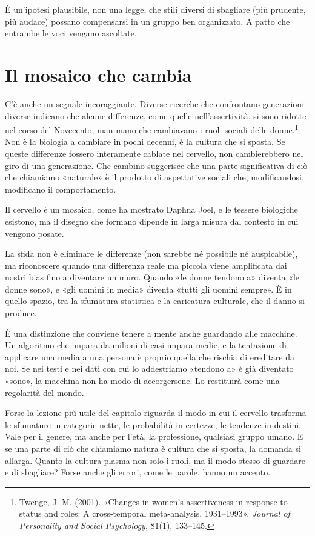 È un'ipotesi plausibile, non una legge, che stili diversi di sbagliare (più prudente, più audace) possano compensarsi in un gruppo ben organizzato. A patto che entrambe le voci vengano ascoltate.

\section{Il mosaico che cambia}

C'è anche un segnale incoraggiante. Diverse ricerche che confrontano generazioni diverse indicano che alcune differenze, come quelle nell'assertività, si sono ridotte nel corso del Novecento, man mano che cambiavano i ruoli sociali delle donne.\footnote{Twenge, J. M. (2001). «Changes in women's assertiveness in response to status and roles: A cross-temporal meta-analysis, 1931--1993». \textit{Journal of Personality and Social Psychology}, 81(1), 133--145.} Non è la biologia a cambiare in pochi decenni, è la cultura che si sposta. Se queste differenze fossero interamente cablate nel cervello, non cambierebbero nel giro di una generazione. Che cambino suggerisce che una parte significativa di ciò che chiamiamo «naturale» è il prodotto di aspettative sociali che, modificandosi, modificano il comportamento.

Il cervello è un mosaico, come ha mostrato Daphna Joel, e le tessere biologiche esistono, ma il disegno che formano dipende in larga misura dal contesto in cui vengono posate.

La sfida non è eliminare le differenze (non sarebbe né possibile né auspicabile), ma riconoscere quando una differenza reale ma piccola viene amplificata dai nostri bias fino a diventare un muro. Quando «le donne tendono a» diventa «le donne sono», e «gli uomini in media» diventa «tutti gli uomini sempre». È in quello spazio, tra la sfumatura statistica e la caricatura culturale, che il danno si produce.

È una distinzione che conviene tenere a mente anche guardando alle macchine. Un algoritmo che impara da milioni di casi impara medie, e la tentazione di applicare una media a una persona è proprio quella che rischia di ereditare da noi. Se nei testi e nei dati con cui lo addestriamo «tendono a» è già diventato «sono», la macchina non ha modo di accorgersene. Lo restituirà come una regolarità del mondo.

Forse la lezione più utile del capitolo riguarda il modo in cui il cervello trasforma le sfumature in categorie nette, le probabilità in certezze, le tendenze in destini. Vale per il genere, ma anche per l'età, la professione, qualsiasi gruppo umano. E se una parte di ciò che chiamiamo natura è cultura che si sposta, la domanda si allarga. Quanto la cultura plasma non solo i ruoli, ma il modo stesso di guardare e di sbagliare? Forse anche gli errori, come le parole, hanno un accento.
